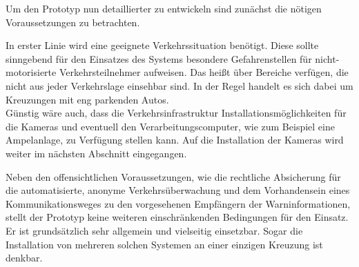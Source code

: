 Um den Prototyp nun detaillierter zu entwickeln sind zunächst die nötigen Voraussetzungen zu betrachten.\kleinerabstand

\noindent In erster Linie wird eine geeignete Verkehrssituation benötigt. Diese sollte sinngebend für den Einsatzes des Systems besondere Gefahrenstellen für nicht-motorisierte Verkehrsteilnehmer aufweisen. Das heißt über Bereiche verfügen, die nicht aus jeder Verkehrslage einsehbar sind. In der Regel handelt es sich dabei um Kreuzungen mit eng parkenden Autos.\\
Günstig wäre auch, dass die Verkehrsinfrastruktur Installationsmöglichkeiten für die Kameras und eventuell den Verarbeitungscomputer, wie zum Beispiel eine Ampelanlage, zu Verfügung stellen kann. Auf die Installation der Kameras wird weiter im nächsten Abschnitt eingegangen.\kleinerabstand

\noindent Neben den offensichtlichen Voraussetzungen, wie die rechtliche Absicherung für die automatisierte, anonyme Verkehrsüberwachung und dem Vorhandensein eines Kommunikationsweges zu den vorgesehenen Empfängern der Warninformationen, stellt der Prototyp keine weiteren einschränkenden Bedingungen für den Einsatz. Er ist grundsätzlich sehr allgemein und vielseitig einsetzbar. Sogar die Installation von mehreren solchen Systemen an einer einzigen Kreuzung ist denkbar.

